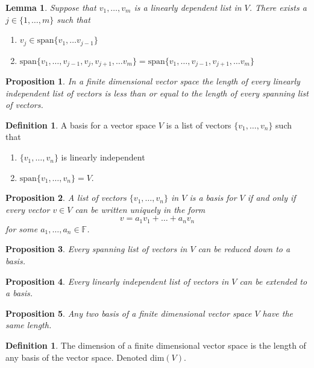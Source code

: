 \documentclass[12pt,letterpaper]{amsart}
\theoremstyle{plain}
\newtheorem{proposition}{Proposition}[section]
\newtheorem{lemma}[theorem]{Lemma}
\theoremstyle{definition}
\newtheorem{definition}[theorem]{Definition}
\numberwithin{equation}{section}
\begin{document}
\begin{lemma} Suppose that $v_1,\ldots, v_m$ is a linearly dependent list in $V$. There exists a $j\in\{1,\ldots, m\}$ such that \\
\begin{enumerate}[1)]
\item $v_j\in \text{span}\{v_1,\ldots v_{j-1}\}$
\item $\text{span}\{v_1,\ldots, v_{j-1},v_j,v_{j+1},\ldots v_m\}=\text{span}\{v_1,\ldots, v_{j-1},v_{j+1},\ldots v_m\}$
\end{enumerate}
\end{lemma}

\begin{proposition} In a finite dimensional vector space the length of every linearly independent list of vectors is less than or equal to the length of every spanning list of vectors. 
\end{proposition}


\begin{definition} A basis for a vector space $V$ is a list of vectors $\{v_1, \ldots, v_n\}$ such that 
\begin{enumerate}[1.]
\item $\{v_1, \ldots, v_n\}$ is linearly independent
\item $\text{span}\{v_1, \ldots, v_n\}=V$. 
\end{enumerate}
\end{definition}
\begin{proposition} A list of vectors $\{v_1, \ldots, v_n\}$ in $V$ is a basis for $V$ if and only if every vector $v\in V$ can be written \emph{uniquely} in the form
\[v=a_1v_1+\ldots+a_nv_n\]
for some $a_1, \ldots, a_n\in \mathbb{F}$. 
\end{proposition}
\begin{proposition} Every spanning list of vectors in $V$ can be reduced down to a basis. 
\end{proposition}

\begin{proposition} Every linearly independent list of vectors in $V$ can be extended to a basis.  
\end{proposition}

\begin{proposition} Any two basis of a finite dimensional vector space $V$ have the same length. 
\end{proposition}

\begin{definition} The dimension of a finite dimensional vector space is the length of any basis of the vector space. Denoted $\text{dim}(V)$. 
\end{definition}
\end{document}
